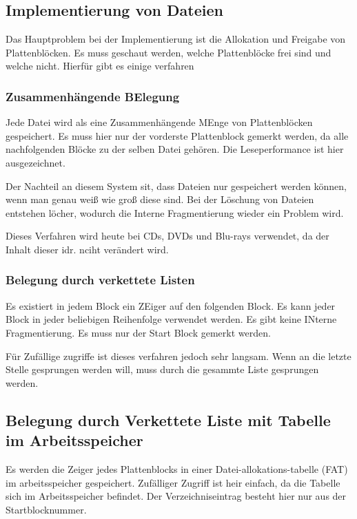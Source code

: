 \subsection{Implementierung von Dateien}

Das Hauptproblem bei der Implementierung ist die Allokation und Freigabe von Plattenblöcken. Es muss geschaut werden, welche Plattenblöcke frei sind und welche nicht. Hierfür gibt es einige verfahren

\subsubsection{Zusammenhängende BElegung}

Jede Datei wird als eine Zusammenhängende MEnge von Plattenblöcken gespeichert. Es muss hier nur der vorderste Plattenblock gemerkt werden, da alle nachfolgenden Blöcke zu der selben Datei gehören. Die Leseperformance ist hier ausgezeichnet. 

Der Nachteil an diesem System sit, dass Dateien nur gespeichert werden können, wenn man genau weiß wie groß diese sind. Bei der Löschung von Dateien entstehen löcher, wodurch die Interne Fragmentierung wieder ein Problem wird.

Dieses Verfahren wird heute bei CDs, DVDs und Blu-rays verwendet, da der Inhalt dieser idr. nciht verändert wird.

\subsubsection{Belegung durch verkettete Listen}

Es existiert in jedem Block ein ZEiger auf den folgenden Block. Es kann jeder Block in jeder beliebigen Reihenfolge verwendet werden. Es gibt keine INterne Fragmentierung. Es muss nur der Start Block gemerkt werden. 

Für Zufällige zugriffe ist dieses verfahren jedoch sehr langsam. Wenn an die letzte Stelle gesprungen werden will, muss durch die gesammte Liste gesprungen werden. 

\subsection{Belegung durch Verkettete Liste mit Tabelle im Arbeitsspeicher}

Es werden die Zeiger jedes Plattenblocks in einer Datei-allokations-tabelle (FAT) im arbeitsspeicher gespeichert. Zufälliger Zugriff ist heir einfach, da die Tabelle sich im Arbeitsspeicher befindet. Der Verzeichniseintrag besteht hier nur aus der Startblocknummer.

